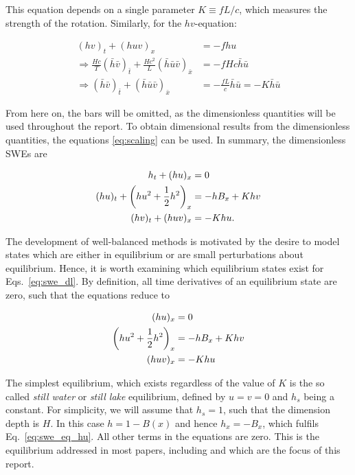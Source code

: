 This equation depends on a single parameter $K \equiv fL/c$, which measures the strength of the rotation. Similarly, for the $hv$-equation:

\begin{align}
  (hv)_t + (huv)_x & = - fhu \\
  \Rightarrow \frac{Hc}{T} (\bar h\bar v)_{\bar t} + \frac{Hc^2}{L} (\bar h\bar u\bar v)_{\bar x} & = - fHc\bar h\bar u \\
  \Rightarrow (\bar h\bar v)_{\bar t} + (\bar h\bar u\bar v)_{\bar x} & = - \frac{fL}{c}\bar h\bar u = -K\bar h\bar u
\end{align}

From here on, the bars will be omitted, as the dimensionless quantities will be used throughout the report. To obtain dimensional results from the dimensionless quantities, the equations \ref{eq:scaling} can be used. In summary, the dimensionless SWEs are

\begin{subequations}
  \label{eq:swe_dl}
  \begin{align}
    h_{t} + (h u)_{x} & = 0 \label{eq:swe_dl_h} \\
    (hu)_{t} + \qty(hu^2 + \frac{1}{2} h^2)_{x} & = - hB_{x} + Khv \label{eq:swe_dl_hu} \\
    (hv)_{t} + (huv)_{x} & = -Khu.\label{eq:swe_dl_hv}
  \end{align}
\end{subequations}

The development of well-balanced methods is motivated by the desire to model states which are either in equilibrium or are small perturbations about equilibrium. Hence, it is worth examining which equilibrium states exist for Eqs.~\ref{eq:swe_dl}. By definition, all time derivatives of an equilibrium state are zero, such that the equations reduce to

\begin{subequations}
  \label{eq:swe_eq}
  \begin{align}
    (h u)_{x} & = 0 \label{eq:swe_eq_h} \\
    \qty(hu^2 + \frac{1}{2} h^2)_{x} & = - hB_{x} + Khv \label{eq:swe_eq_hu}\\
    (huv)_{x} & = -Khu \label{eq:swe_eq_hv}
  \end{align}
\end{subequations}

The simplest equilibrium, which exists regardless of the value of $K$ is the so called \emph{still water} or \emph{still lake} equilibrium, defined by $u = v = 0$ and $h_s$ being a constant. For simplicity, we will assume that $h_s = 1$, such that the dimension depth is $H$. In this case $h = 1 - B(x)$ and hence $h_x = - B_x$, which fulfils Eq.~\ref{eq:swe_eq_hu}. All other terms in the equations are zero. This is the equilibrium addressed in most papers, including \citet{leveque1998balancing} and \citet{rogers2003mathematical} which are the focus of this report.


